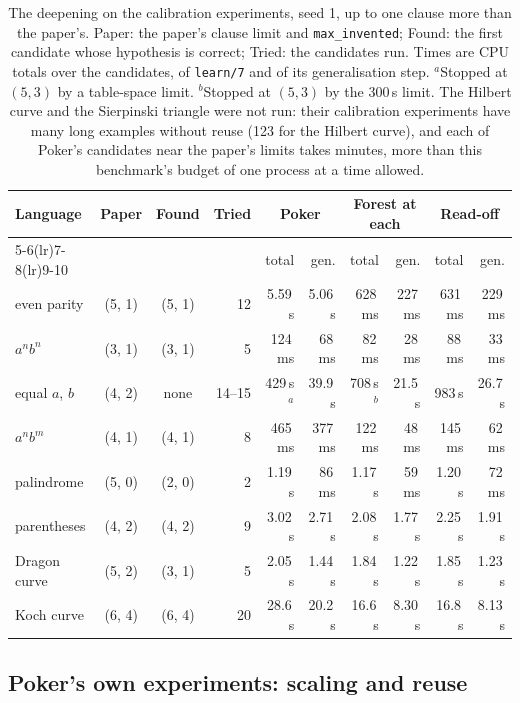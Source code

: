 \documentclass[11pt]{article}
\begin{document}
\begin{table}[ht]
\centering
\footnotesize
\begin{tabular}{lccrrrrrrr}
\toprule
Language & Paper & Found & Tried & \multicolumn{2}{c}{Poker} & \multicolumn{2}{c}{Forest at each} & \multicolumn{2}{c}{Read-off}\\
\cmidrule(lr){5-6}\cmidrule(lr){7-8}\cmidrule(lr){9-10}
 & & & & total & gen. & total & gen. & total & gen.\\
\midrule
even parity    & (5, 1) & (5, 1) & 12 & 5.59\,s & 5.06\,s & 628\,ms & 227\,ms & 631\,ms & 229\,ms\\
$a^nb^n$       & (3, 1) & (3, 1) & 5  & 124\,ms & 68\,ms  & 82\,ms  & 28\,ms  & 88\,ms  & 33\,ms\\
equal $a$, $b$ & (4, 2) & none   & 14--15 & 429\,s$^a$ & 39.9\,s & 708\,s$^b$ & 21.5\,s & 983\,s & 26.7\,s\\
$a^nb^m$       & (4, 1) & (4, 1) & 8  & 465\,ms & 377\,ms & 122\,ms & 48\,ms  & 145\,ms & 62\,ms\\
palindrome     & (5, 0) & (2, 0) & 2  & 1.19\,s & 86\,ms  & 1.17\,s & 59\,ms  & 1.20\,s & 72\,ms\\
parentheses    & (4, 2) & (4, 2) & 9  & 3.02\,s & 2.71\,s & 2.08\,s & 1.77\,s & 2.25\,s & 1.91\,s\\
Dragon curve   & (5, 2) & (3, 1) & 5  & 2.05\,s & 1.44\,s & 1.84\,s & 1.22\,s & 1.85\,s & 1.23\,s\\
Koch curve     & (6, 4) & (6, 4) & 20 & 28.6\,s & 20.2\,s & 16.6\,s & 8.30\,s & 16.8\,s & 8.13\,s\\
\bottomrule
\end{tabular}
\caption{The deepening on the calibration experiments, seed 1, up to one clause more
than the paper's. Paper: the paper's clause limit and \texttt{max\_invented};
Found: the first candidate whose hypothesis is correct; Tried: the candidates run.
Times are CPU totals over the candidates, of \nolinkurl{learn/7} and of its
generalisation step. $^a$Stopped at $(5, 3)$ by a table-space limit. $^b$Stopped at
$(5, 3)$ by the 300\,s limit. The Hilbert curve and the Sierpinski triangle were not
run: their calibration experiments have many long examples without reuse (123 for
the Hilbert curve), and each of Poker's candidates near the paper's limits takes
minutes, more than this benchmark's budget of one process at a time allowed.}
\label{tab:tune}
\end{table}


\subsection{Poker's own experiments: scaling and reuse}
\end{document}
